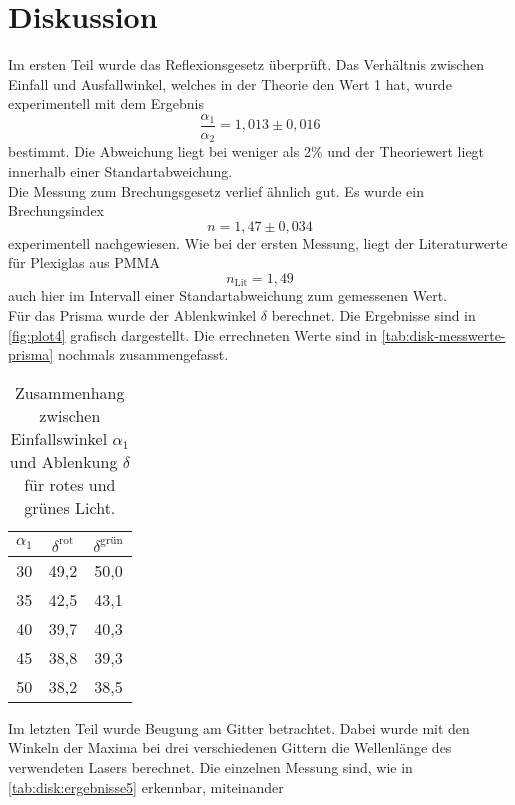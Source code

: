 \section{Diskussion}
\label{sec:Diskussion}
Im ersten Teil wurde das Reflexionsgesetz überprüft. Das Verhältnis zwischen Einfall und
Ausfallwinkel, welches in der Theorie den Wert 1 hat, wurde experimentell mit dem
Ergebnis
\begin{equation}
	\frac{\alpha_1}{\alpha_2} = 1,013 \pm 0,016
\end{equation}
bestimmt. Die Abweichung liegt bei weniger als 2\% und der Theoriewert liegt innerhalb
einer Standartabweichung.
\\
Die Messung zum Brechungsgesetz verlief ähnlich gut. Es wurde ein Brechungsindex 
\begin{equation}
	n = 1,47 \pm 0,034
\end{equation}
experimentell nachgewiesen. Wie bei der ersten Messung, liegt der Literaturwerte für
Plexiglas aus PMMA 
\begin{equation}
	n_\text{Lit} = 1,49
\end{equation}
auch hier im Intervall einer Standartabweichung zum gemessenen Wert.
\\
Für das Prisma wurde der Ablenkwinkel $\delta$ berechnet. Die Ergebnisse sind in
\autoref{fig:plot4} grafisch dargestellt. Die errechneten Werte sind in 
\autoref{tab:disk-messwerte-prisma} nochmals zusammengefasst.
\begin{table}[H]
	\centering
	\caption{Zusammenhang zwischen Einfallswinkel $\alpha_1$ und Ablenkung $\delta$
	für rotes und grünes Licht.}
	\label{tab:disk-messwerte-prisma}
	\begin{tabular}{c c c}
		\toprule
		$\alpha_1$ &
		$\delta^\text{rot}$ &
		$\delta^\text{grün}$ \\
		\midrule
		30 & 49,2 & 50,0	\\
		35 & 42,5 & 43,1	\\
		40 & 39,7 & 40,3	\\
		45 & 38,8 & 39,3	\\
		50 & 38,2 & 38,5	\\
		\bottomrule
	\end{tabular}
\end{table}
\noindent
Im letzten Teil wurde Beugung am Gitter betrachtet. Dabei wurde mit den Winkeln der Maxima
bei drei verschiedenen Gittern die Wellenlänge des verwendeten Lasers berechnet. Die
einzelnen Messung sind, wie in  \autoref{tab:disk:ergebnisse5} erkennbar, miteinander
